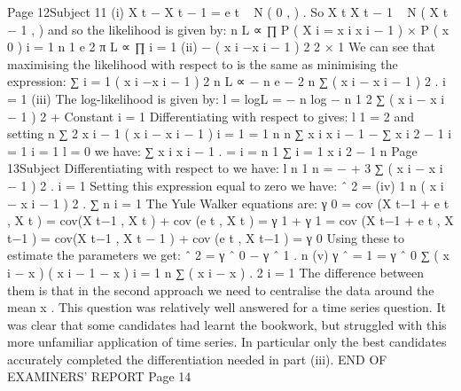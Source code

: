 Page 12Subject %
11
(i)
X t − \alpha X t − 1 = e t ~ N ( 0 ,  ) .
So X t X t − 1 ~ N ( \alpha X t − 1 ,  )
and so the likelihood is given by:
n
L ∝ ∏ P ( X i = x i x i − 1 ) × P ( x 0 )
i = 1
n
1
e
2 π\sigma
L ∝ ∏
i = 1
(ii)
−
( x i −\alpha x i − 1 ) 2
2 
× 1
We can see that maximising the likelihood with respect to \alpha is the same as
minimising the expression:
∑ i = 1 ( x i −\alpha x i − 1 ) 2
n
L ∝ \sigma − n e
−
2 
n
∑ ( x i − \alpha x i − 1 ) 2 .
i = 1
(iii)
The log-likelihood is given by:
l = logL = − n log \sigma −
n
1
2 
∑ ( x i − \alpha x i − 1 ) 2 + Constant
i = 1
Differentiating with respect to \alpha gives:
\partial  l
1
= 2
\partial {} \sigma
and setting
n
∑ 2 x i − 1 ( x i − \alpha x i − 1 )
i = 1
=
1
n
\alpha
n
∑ x i x i − 1 −  ∑ x i 2 − 1
i = 1
i = 1
\partial  l
= 0 we have:
\partial \alpha
∑ x i x i − 1 .
\hat{\alpha} = i = n 1
∑ i = 1 x i 2 − 1
n
Page 13Subject %
Differentiating with respect to \sigma we have:
\partial  l
n 1 n
= − + 3 ∑ ( x i − \alpha x i − 1 ) 2 .
\partial \sigma
\sigma \sigma i = 1
Setting this expression equal to zero we have:
\sigma ˆ 2 =
(iv)
1 n
( x i − \hat{\alpha} x i − 1 ) 2 .
∑
n i = 1
The Yule Walker equations are:
γ 0 = cov (\alpha X t−1 + e t , X t ) = \alpha cov(X t−1 , X t ) + cov (e t , X t ) = \alpha γ 1 + 
γ 1 = cov (\alpha X t−1 + e t , X t−1 ) = \alpha cov(X t−1 , X t − 1 ) + cov (e t , X t−1 ) = \alpha γ 0
Using these to estimate the parameters we get:
\sigma ˆ 2 = γ ˆ 0 − \hat{\alpha} γ ˆ 1 .
n
(v)
γ ˆ
\hat{\alpha} = 1 =
γ ˆ 0
∑ ( x i − x ) ( x i − 1 − x )
i = 1
n
∑ ( x i − x )
.
2
i = 1
The difference between them is that in the second approach we need to
centralise the data around the mean x .
This question was relatively well answered for a time series question. It was clear that some
candidates had learnt the bookwork, but struggled with this more unfamiliar application of
time series. In particular only the best candidates accurately completed the differentiation
needed in part (iii).
END OF EXAMINERS’ REPORT
Page 14
